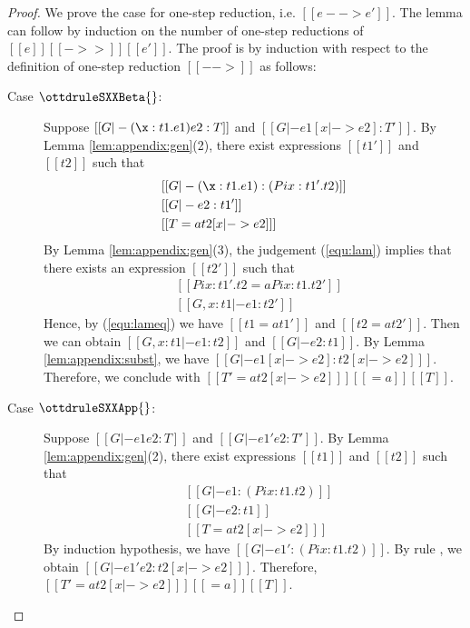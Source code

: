 \begin{proof}
    We prove the case for one-step reduction, i.e. $[[e --> e']]$. The lemma
can follow by induction on the number of one-step reductions of $[[e]] [[->>]]
[[e']]$.
    The proof is by induction with respect to the definition of one-step
reduction $[[-->]]$ as follows:
    \begin{description}
        \item[Case $\ottdruleSXXBeta{}$:] $\quad$ \\
        Suppose $[[G |- (\x:t1.e1)e2 :T]]$ and $[[G |- e1 [x |-> e2] :T']]$. By
Lemma \ref{lem:appendix:gen}(2), there exist expressions $[[t1']]$ and $[[t2]]$
such that 
        \begin{align}
            &[[G |- (\x:t1.e1):(Pi x:t1'.t2)]] \label{equ:lam} \\
            &[[G |- e2:t1']] \nonumber \\
            &[[T =a t2 [x |-> e2] ]] \nonumber
        \end{align}
        By Lemma \ref{lem:appendix:gen}(3), the judgement (\ref{equ:lam})
implies that there exists an expression $[[t2']]$ such that
        \begin{align}
            &[[Pi x:t1'.t2 =a Pi x:t1.t2']] \label{equ:lameq}\\
            &[[G, x:t1 |- e1:t2']] \nonumber
        \end{align}
        Hence, by (\ref{equ:lameq}) we have $[[t1 =a t1']]$ and $[[t2 =a
t2']]$. Then we can obtain $[[G, x:t1 |- e1:t2]]$ and $[[G |- e2:t1]]$. By
Lemma \ref{lem:appendix:subst}, we have $[[G |- e1[x |-> e2] : t2[x |-> e2]
]]$. Therefore, we conclude with $[[T' =a t2[x |-> e2] ]] [[=a]] [[T]]$.
        
        \item[Case $\ottdruleSXXApp{}$:] $\quad$ \\
        Suppose $[[G |- e1 e2 :T]]$ and $[[G |- e1' e2 :T']]$. By Lemma
\ref{lem:appendix:gen}(2), there exist expressions $[[t1]]$ and $[[t2]]$ such
that 
        \begin{align*}
            &[[G |- e1:(Pi x:t1.t2)]] \\
            &[[G |- e2:t1]]\\
            &[[T =a t2 [x |-> e2] ]]
        \end{align*}
        By induction hypothesis, we have $[[G |- e1':(Pi x:t1.t2)]]$. By rule
, we obtain $[[G |- e1' e2 : t2[x |-> e2] ]]$. Therefore, $[[T'
=a t2[x |-> e2] ]] [[=a]] [[T]]$.
        

\end{description}
\end{proof}
